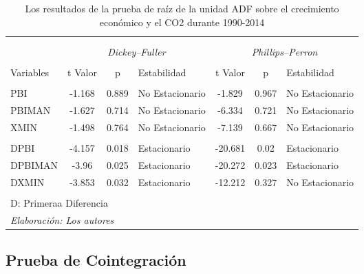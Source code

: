 \documentclass[11pt,]{article}
\begin{document}
\begin{table}[!htbp] \centering 
  \caption{Los resultados de la prueba de raíz de la unidad ADF sobre el crecimiento económico y el CO2 durante 1990-2014} 
  \label{tab:tb2} 
\begin{tabular}{@{\extracolsep{5pt}} lcclccl} 
\\[-1.8ex]\hline 
\hline \\[-1.8ex] 
\\[-1.8ex] &  \multicolumn{3}{c}{\textit{Dickey–Fuller}} &  \multicolumn{3}{c}{\textit{Phillips–Perron}}\\
\\[-1.8ex] Variables & t Valor & p & Estabilidad & t Valor & p & Estabilidad\\
\hline \\[-1.8ex] 
PBI & -1.168 & 0.889 & No Estacionario & -1.829 & 0.967 & No Estacionario \\ 
PBIMAN & -1.627 & 0.714 & No Estacionario & -6.334 & 0.721 & No Estacionario \\ 
XMIN & -1.498 & 0.764 & No Estacionario & -7.139 & 0.667 & No Estacionario \\ 
 &  &  &  &  &  &  \\ 
DPBI & -4.157 & 0.018 & Estacionario & -20.681 & 0.02 & Estacionario \\ 
DPBIMAN & -3.96 & 0.025 & Estacionario & -20.272 & 0.023 & Estacionario \\ 
DXMIN & -3.853 & 0.032 & Estacionario & -12.212 & 0.327 & No Estacionario \\ 
\hline \\[-1.8ex] 
\multicolumn{7}{l}{\footnotesize{D: Primeraa Diferencia}} \\ 
\multicolumn{7}{l}{\footnotesize{\textit{Elaboración: Los autores}}} \\ 
\end{tabular} 
\end{table}

\hypertarget{prueba-de-cointegracion}{%
\subsection{Prueba de Cointegración}\label{prueba-de-cointegracion}}
\end{document}

